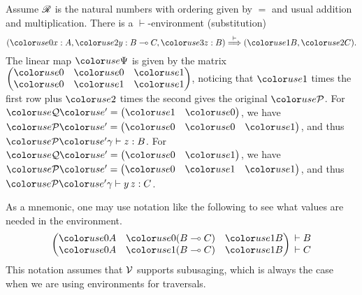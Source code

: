 \begin{example}
  Assume $\mathscr R$ is the natural numbers with ordering given by $=$ and usual
  addition and multiplication.
  There is a $\vdash$-environment (substitution)
  \[
    \plr{\gr0x : A, \gr2y : B \multimap C, \gr3z : B} \env\vdash
    \plr{\gr1B, \gr2C}.
  \]
  The linear map $\gr\Psi$ is given by the matrix
  \(
    \begin{pmatrix}
      \gr0 & \gr0 & \gr1 \\
      \gr0 & \gr1 & \gr1
    \end{pmatrix}
  \),
  noticing that $\gr1$ times the first row plus $\gr2$ times the second gives
  the original $\grP$.
  For $\grQprime = \begin{pmatrix} \gr1 & \gr0 \end{pmatrix}$, we have
  $\grPprime = \begin{pmatrix} \gr0 & \gr0 & \gr1 \end{pmatrix}$, and thus
  $\grPprime\gamma \vdash z : B$.
  For $\grQprime = \begin{pmatrix} \gr0 & \gr1 \end{pmatrix}$, we have
  $\grPprime = \begin{pmatrix} \gr0 & \gr1 & \gr1 \end{pmatrix}$, and thus
  $\grPprime\gamma \vdash y\,z : C$.
\end{example}

As a mnemonic, one may use notation like the following to see what values are
needed in the environment.
\[
  \begin{pmatrix}
    \gr0A & \gr0\plr{B \multimap C} & \gr1B \\
    \gr0A & \gr1\plr{B \multimap C} & \gr1B
  \end{pmatrix}
  \begin{matrix}
    {} \vdash B \\
    {} \vdash C
  \end{matrix}
\]
This notation assumes that $\mathcal V$ supports subusaging, which is
always the case when we are using environments for traversals.

